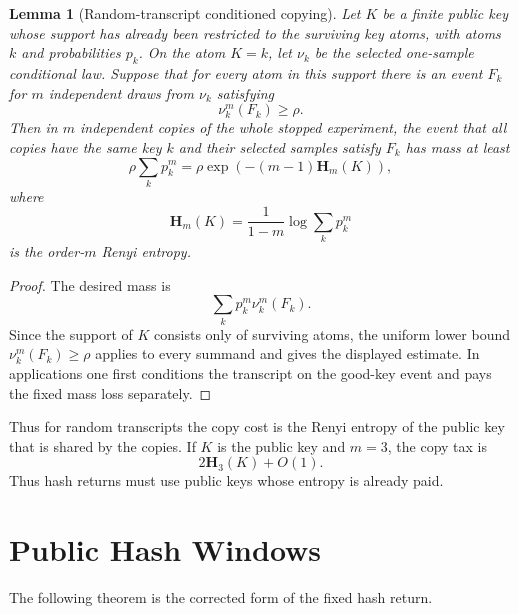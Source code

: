 \documentclass[11pt]{article}
\newtheorem{lemma}[theorem]{Lemma}
\newcommand{\bfH}{\mathbf H}
\begin{document}
\begin{lemma}[Random-transcript conditioned copying]
\label{lem:random-copy}
Let $K$ be a finite public key whose support has already been restricted to the
surviving key atoms, with atoms $k$ and probabilities $p_k$.  On the atom
$K=k$, let $\nu_k$ be the selected one-sample conditional law.  Suppose that for
every atom in this support there is an event $F_k$ for $m$ independent draws
from $\nu_k$ satisfying
\[
  \nu_k^m(F_k)\ge \rho .
\]
Then in $m$ independent copies of the whole stopped experiment, the event that
all copies have the same key $k$ and their selected samples satisfy $F_k$ has
mass at least
\[
  \rho\sum_k p_k^m
  =
  \rho\exp(-(m-1)\bfH_m(K)),
\]
where
\[
  \bfH_m(K)=\frac{1}{1-m}\log\sum_k p_k^m
\]
is the order-$m$ Renyi entropy.
\end{lemma}

\begin{proof}
The desired mass is
\[
  \sum_k p_k^m\nu_k^m(F_k).
\]
Since the support of $K$ consists only of surviving atoms, the uniform lower
bound $\nu_k^m(F_k)\ge\rho$ applies to every summand and gives the displayed
estimate.  In applications one first conditions the transcript on the good-key
event and pays the fixed mass loss separately.
\end{proof}

Thus for random transcripts the copy cost is the Renyi entropy of the public
key that is shared by the copies.  If $K$ is the public key and $m=3$, the copy
tax is
\[
  2\bfH_3(K)+O(1).
\]
Thus hash returns must use public keys whose entropy is already paid.

\section{Public Hash Windows}

The following theorem is the corrected form of the fixed hash return.
\end{document}
